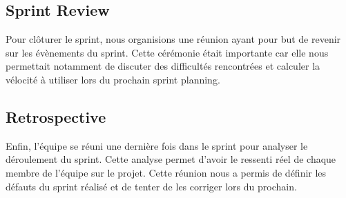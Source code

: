 \documentclass[11pt]{report}
\begin{document}
\subsection{Sprint Review}

Pour clôturer le sprint, nous organisions une réunion ayant pour but de revenir sur les évènements du sprint.
Cette cérémonie était importante car elle nous permettait notamment de discuter des difficultés rencontrées et calculer la vélocité 
à utiliser lors du prochain sprint planning.

\subsection{Retrospective}
Enfin, l'équipe se réuni une dernière fois dans le sprint pour analyser le déroulement du sprint. Cette analyse permet d'avoir
le ressenti réel de chaque membre de l'équipe sur le projet. Cette réunion nous a permis de définir les défauts du sprint réalisé
et de tenter de les corriger lors du prochain.
\end{document}
